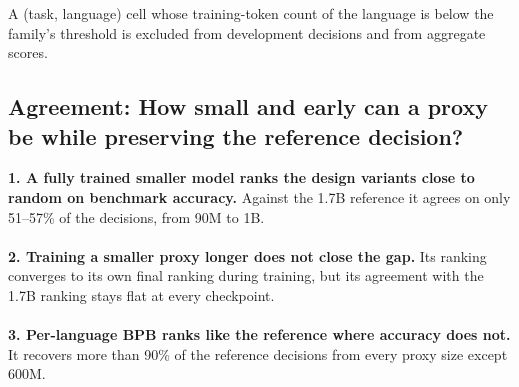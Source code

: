 A (task, language) cell whose training-token count of the language is below the family's threshold is excluded from development decisions and from aggregate scores. %

\subsection{Agreement: How small and early can a proxy be while preserving the reference decision?}
\label{subsec:rq2}

\begin{rqfinding}
\textbf{1. A fully trained smaller model ranks the design variants close to random on benchmark accuracy.} Against the 1.7B reference it agrees on only 51--57\% of the decisions, from 90M to 1B.
\\
\\
\textbf{2. Training a smaller proxy longer does not close the gap.} Its ranking converges to its own final ranking during training, but its agreement with the 1.7B ranking stays flat at every checkpoint.
\\
\\
\textbf{3. Per-language BPB ranks like the reference where accuracy does not.} It recovers more than 90\% of the reference decisions from every proxy size except 600M.
\end{rqfinding}

